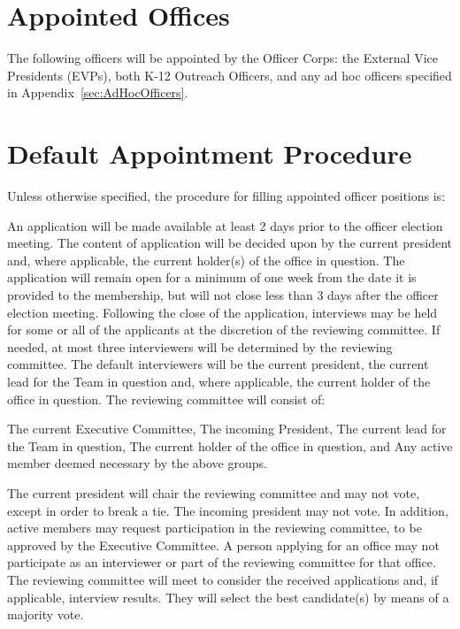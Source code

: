 \section{Appointed Offices}\label{sec:appointedofficers} The following officers will be appointed by the Officer Corps: the External Vice Presidents (EVPs), both K-12 Outreach Officers, and any ad hoc officers specified in Appendix~\ref{sec:AdHocOfficers}. %
\section{Default Appointment Procedure} Unless otherwise specified, the procedure for filling appointed officer positions is: 
\begin{enumsubsection}
	\itemnotoc An application will be made available at least 2 days prior to the officer election meeting.
	\itemnotoc The content of application will be decided upon by the current president and, where applicable, the current holder(s) of the office in question. 
	\itemnotoc The application will remain open for a minimum of one week from the date it is provided to the membership, but will not close less than 3 days after the officer election meeting.
	\itemnotoc Following the close of the application, interviews may be held for some or all of the applicants at the discretion of the reviewing committee. If needed, at most three interviewers will be determined by the reviewing committee. The default interviewers will be the current president, the current lead for the Team in question and, where applicable, the current holder of the office in question.
	\itemnotoc The reviewing committee will consist of:
	\begin{enumsubsubsection}
		\itemnotoc The current Executive Committee,
		\itemnotoc The incoming President,
		\itemnotoc The current lead for the Team in question,
		\itemnotoc The current holder of the office in question, and
		\itemnotoc Any active member deemed necessary by the above groups.
	\end{enumsubsubsection}
	The current president will chair the reviewing committee and may not vote, except in order to break a tie. The incoming president may not vote. In addition, active members may request participation in the reviewing committee, to be approved by the Executive Committee.
	\itemnotoc A person applying for an office may not participate as an interviewer or part of the reviewing committee for that office.
	\itemnotoc The reviewing committee will meet to consider the received applications and, if applicable, interview results. They will select the best candidate(s) by means of a majority vote.
\end{enumsubsection}
